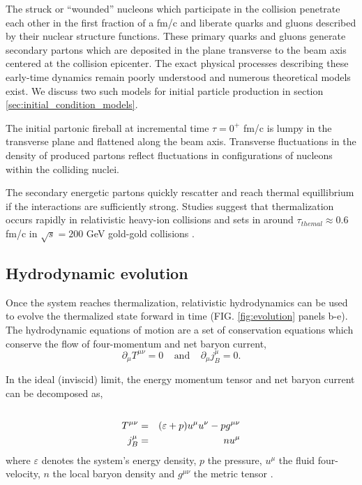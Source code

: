\documentclass[aps,prc,reprint,amsmath,nofootinbib]{revtex4-1}
\begin{document}
The struck or ``wounded'' nucleons which participate in the collision penetrate each other in the first fraction of a fm/c and liberate quarks and gluons described by 
their nuclear structure functions. These primary quarks and gluons generate secondary partons which are deposited in the plane transverse to the beam axis centered 
at the collision epicenter. The exact physical processes describing these early-time dynamics remain poorly understood and numerous theoretical models exist. We 
discuss two such models for initial particle production in section \ref{sec:initial_condition_models}. 

The initial partonic fireball at incremental time $\tau=0^+$ fm/c is lumpy in the transverse plane and flattened along the beam axis. Transverse fluctuations in the 
density of produced partons reflect fluctuations in configurations of nucleons within the colliding nuclei. 

The secondary energetic partons quickly rescatter and reach thermal equillibrium if the interactions are sufficiently strong. Studies suggest that thermalization 
occurs rapidly in relativistic heavy-ion collisions and sets in around $\tau_{themal} \approx 0.6$ fm/c in $\sqrt{s} = 200$ GeV gold-gold collisions \cite{Heinz:2001xi}.

\subsection{Hydrodynamic evolution}

Once the system reaches thermalization, relativistic hydrodynamics can be used to evolve the thermalized state forward in time (FIG. \ref{fig:evolution} panels b-e). The hydrodynamic equations of motion 
are a set of conservation equations which conserve the flow of four-momentum and net baryon current,
\begin{equation}
 \partial_\mu T^{\mu\nu} = 0 ~~~~~\mbox{and}~~~~~ \partial_\mu j_B^\mu = 0.
\end{equation}

In the ideal (inviscid) limit, the energy momentum tensor and net baryon current can be decomposed as,
\begin{eqnarray}
 \label{energymomentum_tensor}
 \cr T^{\mu\nu} &=& (\varepsilon + p) u^\mu u^\nu - p g^{\mu\nu} \\
 j_B^\mu &=& n u^\mu
\end{eqnarray}
where $\varepsilon$ denotes the system's energy density, $p$ the pressure, $u^\mu$ the fluid four-velocity, $n$ the local baryon density and $g^{\mu\nu}$ the metric 
tensor \cite{kolb}.
\end{document}
